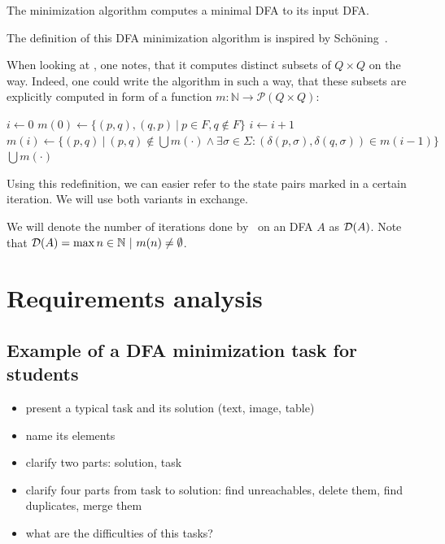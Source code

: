 \begin{theorem}
	The minimization algorithm computes a minimal DFA to its input DFA.
\end{theorem}
\noindent The definition of this DFA minimization algorithm is inspired by Schöning~\cite[p. 46]{schoening01}.

When looking at \MinMark, one notes, that it computes distinct subsets of $Q \times Q$ on the way. Indeed, one could write the algorithm in such a way, that these subsets are explicitly computed in form of a function $m\colon\mathbb{N}\to\mathcal{P}(Q\times Q)$:
\vspace{0.2cm}
\begin{algorithmic}[1]
	\State $i \gets 0$
	\State $m(0) \gets \{ (p,q), (q,p)\ |\ p \in F, q \notin F \}$
	\Do
		\State $i \gets i + 1$
		\State $m(i) \gets \{ (p,q)\ |\ (p,q) \notin \bigcup{m(\cdot)} \land \exists \sigma \in \Sigma \colon (\delta(p,\sigma), \delta(q,\sigma)) \in m(i-1) \}$
	\State \Return $\bigcup{m(\cdot)}$
	\EndFunction
\end{algorithmic}
\vspace{0.2cm}
Using this redefinition, we can easier refer to the state pairs marked in a certain iteration. We will use both variants in exchange.

We will denote the number of iterations done by \MinMark\ on an DFA $A$ as $\mathcal{D}(A)$. Note that $\mathcal{D}(A) = \max n \in \mathbb{N}\ |\ m(n) \neq \emptyset$.


\section{Requirements analysis}

\subsection{Example of a DFA minimization task for students}

\begin{itemize}
	\item present a typical task and its solution (text, image, table)
	\item name its elements
	\item clarify two parts: solution, task
	\item clarify four parts from task to solution: find unreachables, delete them, find duplicates, merge them
	\item what are the difficulties of this tasks?
\end{itemize}

